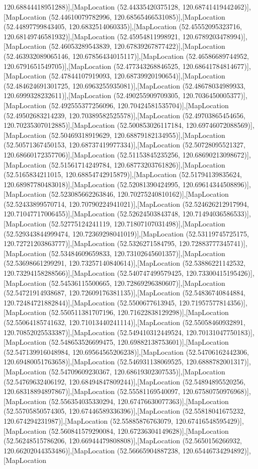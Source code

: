 120.68844418951288)],[MapLocation (52.44335420375128, 120.68741419442462)],[MapLocation (52.44610079782996, 120.68565466531085)],[MapLocation (52.44897799843405, 120.6832514060335)],[MapLocation (52.45552095323716, 120.68149746581932)],[MapLocation (52.45954811998921, 120.6789203478994)],[MapLocation (52.46053289543839, 120.67839267877422)],[MapLocation (52.463932089065146, 120.67856434015117)],[MapLocation (52.46586689744952, 120.6791651549705)],[MapLocation (52.477343268846525, 120.68641784814677)],[MapLocation (52.47844107919093, 120.68739920190654)],[MapLocation (52.484624691301725, 120.6963255935081)],[MapLocation (52.48678034989933, 120.6999328232611)],[MapLocation (52.490255909709305, 120.7036450005377)],[MapLocation (52.492555377256096, 120.70424581535704)],[MapLocation (52.49502683214239, 120.70389582525578)],[MapLocation (52.49703865454656, 120.70235307012885)],[MapLocation (52.500853026117184, 120.69746072088569)],[MapLocation (52.50469318919629, 120.68879182134955)],[MapLocation (52.50571367450153, 120.68737419977334)],[MapLocation (52.50728095521327, 120.68660172357706)],[MapLocation (52.51153845235256, 120.68690213098672)],[MapLocation (52.51561714249784, 120.68773203761826)],[MapLocation (52.5165834211015, 120.68854742915879)],[MapLocation (52.51794139835624, 120.68987780483018)],[MapLocation (52.52081390424995, 120.69614344508896)],[MapLocation (52.523085662263846, 120.70275240810162)],[MapLocation (52.52433899570714, 120.70790224941021)],[MapLocation (52.524626212917994, 120.71047717006455)],[MapLocation (52.52624503843748, 120.71494036586533)],[MapLocation (52.52775124241119, 120.71807107031498)],[MapLocation (52.529343844999474, 120.72369298041019)],[MapLocation (52.53119745725175, 120.72721203863777)],[MapLocation (52.5326271584795, 120.72883777345741)],[MapLocation (52.53484609659833, 120.73102645601357)],[MapLocation (52.53698661299291, 120.73257140840614)],[MapLocation (52.53886221142532, 120.73294158288566)],[MapLocation (52.540747499579425, 120.73300415195426)],[MapLocation (52.54536115500665, 120.72869296380607)],[MapLocation (52.54721914938687, 120.72609176381135)],[MapLocation (52.54836740844884, 120.72484721882844)],[MapLocation (52.5500677613945, 120.71957577814356)],[MapLocation (52.550511381707196, 120.71622838129298)],[MapLocation (52.55064185741632, 120.71013440241114)],[MapLocation (52.55058460932891, 120.70852025533387)],[MapLocation (52.549410312449524, 120.70131047750183)],[MapLocation (52.548653526699475, 120.69882138753601)],[MapLocation (52.547139916048984, 120.69564565206238)],[MapLocation (52.54706162442306, 120.69480051763658)],[MapLocation (52.546931138069525, 120.6888782001317)],[MapLocation (52.54709609230367, 120.68619302307535)],[MapLocation (52.54769632406192, 120.68494847809244)],[MapLocation (52.54894895520256, 120.68318894897867)],[MapLocation (52.55581169540097, 120.67580750976968)],[MapLocation (52.556354035330294, 120.67476630077363)],[MapLocation (52.55705850574305, 120.67446589336396)],[MapLocation (52.55818041675232, 120.674294231987)],[MapLocation (52.55885876763079, 120.67416548595429)],[MapLocation (52.560841579290084, 120.67236304149628)],[MapLocation (52.56248515786206, 120.66944479808808)],[MapLocation (52.5650156266932, 120.66202044353486)],[MapLocation (52.56665904887238, 120.65446734294892)],[MapLocation 